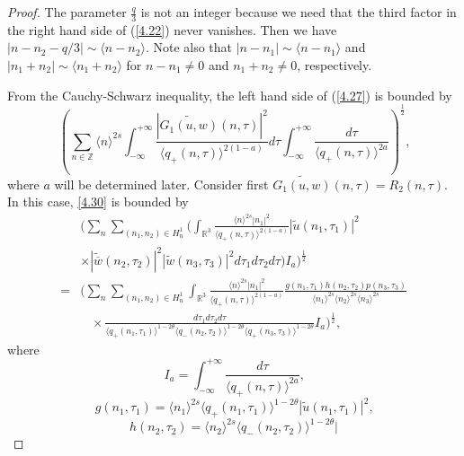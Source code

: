\documentclass[reqno]{amsart}
\numberwithin{equation}{section}
\begin{document}
\begin{proof}
The parameter $\frac{q}{3}$ is not an integer because we need that
the third factor in the right hand side of (\ref{4.22}) never
vanishes. Then we have $|n -n_2- q/3| \sim \langle n -n_2
\rangle$. Note also that $|n -n_1| \sim \langle n -n_1 \rangle$
and $|n_1 +n_2| \sim \langle n_1 +n_2 \rangle$ for $n- n_1 \ne 0 $
and $n_1 +n_2 \ne 0$, respectively.

 From the Cauchy-Schwarz inequality, the left hand
side of (\ref{4.27}) is bounded by
\begin{equation}\label{4.30}
\left(  \sum\limits_{n\in\mathbb{Z}}\langle
n\rangle^{2s}\int_{-\infty
}^{+\infty}\frac{| \widetilde{G_{1}(u,w)}(n,\tau)| ^{2}}{\langle q_{+}(n,\tau)\rangle^{2(1-a)}}d\tau\int_{-\infty}^{+\infty}\frac{d\tau}{\langle q_{+}(n,\tau)\rangle^{2a}}\right)  ^{\frac{1}{2}}\text{,}
\end{equation}
where $a$ will be determined later. Consider first
$\widetilde{G_{1}(u,w)}(n,\tau)=R_{2}(n,\tau)$. In this case, \eqref{4.30} is bounded by
\begin{equation}\label{4.31}
\begin{split}
&\Big( \sum\limits_{n}\sum\limits_{(n_{1},n_{2})\in H_{n}^{1}}\Big( \int_{\mathbb{R}^{3}}
\frac{\langle n\rangle^{2s}| n_1|^2}{\langle q_{+}(n,\tau)\rangle^{2(1-a)}}| \widetilde{u}(n_1,\tau_1)| ^2\\
&\times |\widetilde{\overline{w}}(n_{2},\tau_{2})| ^{2}
|\widetilde{w}(n_3,\tau_3)|^2 d\tau_{1}d\tau_{2}d\tau\Big)  I_{a}\Big)^{\frac{1}{2}}\\
=&\Big( \sum\limits_{n}\sum\limits_{(n_{1},n_{2})\in H_{n}^{1}}
\int_{\mathbb{R}^{3}}\frac{\langle n\rangle^{2s}|n_1|^2}{\langle q_{+}(n,\tau)\rangle^{2(1-a)}}
\frac{g(n_{1},\tau_{1})h(n_{2},\tau_{2})p(n_3,\tau_3)}{\langle
n_{1}\rangle^{2s}\langle n_{2}\rangle^{2s}\langle n_3\rangle^{2s}}\\
&\;\;\; \times\frac{d\tau_{1}d\tau_{2}d\tau}{\langle
q_{+}(n_{1},\tau _{1})\rangle^{1-2\theta}\langle q_{-}(n_{2},\tau_{2})\rangle^{1-2\theta}
\langle q_{+}(n_3,\tau_3)\rangle^{1-2\theta}}I_{a}\Big)  ^{\frac{1}{2}},
\end{split}
\end{equation}
where\[
I_{a}=\int_{-\infty}^{+\infty}\frac{d\tau}{\langle q_{+}(n,\tau)\rangle^{2a}}\text{,}\]\[
g(n_{1},\tau_{1})=\langle n_{1}\rangle^{2s}\langle
q_{+}(n_{1},\tau _{1})\rangle^{1-2\theta}|
\widetilde{u}(n_{1},\tau_{1})|
^{2}\text{,}\]\[
h(n_{2},\tau_{2})=\langle n_{2}\rangle^{2s}\langle
q_{-}(n_{2},\tau _{2})\rangle^{1-2\theta}|
\]
\end{proof}
\end{document}
